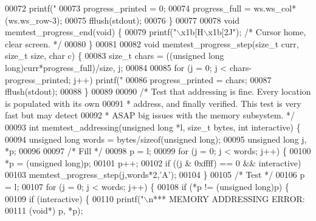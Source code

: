 \begin{DoxyCode}
00072     printf(\textcolor{stringliteral}{"%
00073     progress\_printed = 0;
00074     progress\_full = ws.ws\_col*(ws.ws\_row-3);
00075     fflush(stdout);
00076 \}
00077 
00078 \textcolor{keywordtype}{void} memtest\_progress\_end(\textcolor{keywordtype}{void}) \{
00079     printf(\textcolor{stringliteral}{"\(\backslash\)x1b[H\(\backslash\)x1b[2J"});    \textcolor{comment}{/* Cursor home, clear screen. */}
00080 \}
00081 
00082 \textcolor{keywordtype}{void} memtest\_progress\_step(size\_t curr, size\_t size, \textcolor{keywordtype}{char} c) \{
00083     size\_t chars = ((\textcolor{keywordtype}{unsigned} \textcolor{keywordtype}{long} \textcolor{keywordtype}{long})curr*progress\_full)/size, j;
00084 
00085     \textcolor{keywordflow}{for} (j = 0; j < chars-progress\_printed; j++) printf(\textcolor{stringliteral}{"%
00086     progress\_printed = chars;
00087     fflush(stdout);
00088 \}
00089 
00090 \textcolor{comment}{/* Test that addressing is fine. Every location is populated with its own}
00091 \textcolor{comment}{ * address, and finally verified. This test is very fast but may detect}
00092 \textcolor{comment}{ * ASAP big issues with the memory subsystem. */}
00093 \textcolor{keywordtype}{int} memtest\_addressing(\textcolor{keywordtype}{unsigned} \textcolor{keywordtype}{long} *l, size\_t bytes, \textcolor{keywordtype}{int} interactive) \{
00094     \textcolor{keywordtype}{unsigned} \textcolor{keywordtype}{long} words = bytes/\textcolor{keyword}{sizeof}(\textcolor{keywordtype}{unsigned} \textcolor{keywordtype}{long});
00095     \textcolor{keywordtype}{unsigned} \textcolor{keywordtype}{long} j, *p;
00096 
00097     \textcolor{comment}{/* Fill */}
00098     p = l;
00099     \textcolor{keywordflow}{for} (j = 0; j < words; j++) \{
00100         *p = (\textcolor{keywordtype}{unsigned} \textcolor{keywordtype}{long})p;
00101         p++;
00102         \textcolor{keywordflow}{if} ((j & 0xffff) == 0 && interactive)
00103             memtest\_progress\_step(j,words*2,\textcolor{stringliteral}{'A'});
00104     \}
00105     \textcolor{comment}{/* Test */}
00106     p = l;
00107     \textcolor{keywordflow}{for} (j = 0; j < words; j++) \{
00108         \textcolor{keywordflow}{if} (*p != (\textcolor{keywordtype}{unsigned} \textcolor{keywordtype}{long})p) \{
00109             \textcolor{keywordflow}{if} (interactive) \{
00110                 printf(\textcolor{stringliteral}{"\(\backslash\)n*** MEMORY ADDRESSING ERROR: %
00111                     (\textcolor{keywordtype}{void}*) p, *p);
}}}
\end{DoxyCode}
